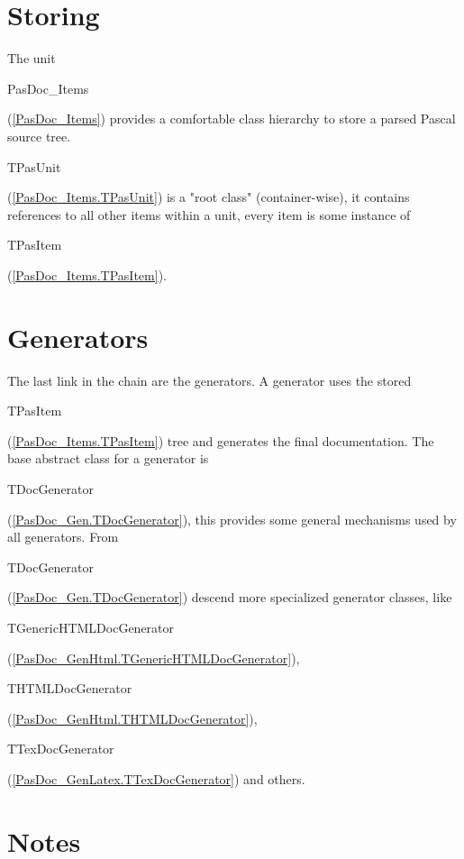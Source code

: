 \documentclass{report}
\begin{document}
\label{SecStoring}
\section{Storing}


The unit \begin{ttfamily}PasDoc{\_}Items\end{ttfamily}(\ref{PasDoc_Items}) provides a comfortable class hierarchy to store a parsed Pascal source tree. \begin{ttfamily}TPasUnit\end{ttfamily}(\ref{PasDoc_Items.TPasUnit}) is a "root class" (container{-}wise), it contains references to all other items within a unit, every item is some instance of \begin{ttfamily}TPasItem\end{ttfamily}(\ref{PasDoc_Items.TPasItem}).

\label{SecGenerators}
\section{Generators}


The last link in the chain are the generators. A generator uses the stored \begin{ttfamily}TPasItem\end{ttfamily}(\ref{PasDoc_Items.TPasItem}) tree and generates the final documentation. The base abstract class for a generator is \begin{ttfamily}TDocGenerator\end{ttfamily}(\ref{PasDoc_Gen.TDocGenerator}), this provides some general mechanisms used by all generators. From \begin{ttfamily}TDocGenerator\end{ttfamily}(\ref{PasDoc_Gen.TDocGenerator}) descend more specialized generator classes, like \begin{ttfamily}TGenericHTMLDocGenerator\end{ttfamily}(\ref{PasDoc_GenHtml.TGenericHTMLDocGenerator}), \begin{ttfamily}THTMLDocGenerator\end{ttfamily}(\ref{PasDoc_GenHtml.THTMLDocGenerator}), \begin{ttfamily}TTexDocGenerator\end{ttfamily}(\ref{PasDoc_GenLatex.TTexDocGenerator}) and others.

\label{SecNotes}
\section{Notes}
\end{document}
